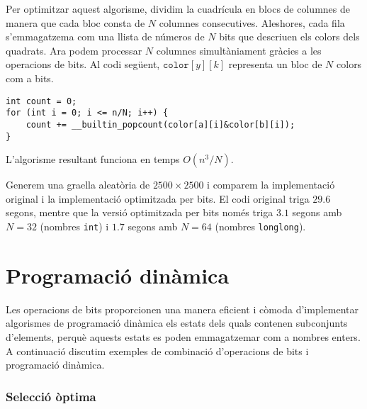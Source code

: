 Per optimitzar aquest algorisme, dividim la cuadrícula en blocs de
columnes de manera que cada bloc consta de $N$ columnes
consecutives. Aleshores, cada fila s'emmagatzema com una llista de
números de $N$ bits que descriuen els colors dels quadrats. Ara podem
processar $N$ columnes simultàniament gràcies a les operacions de
bits. Al codi següent, $\texttt{color}[y][k]$ representa un bloc de
$N$ colors com a bits.
\begin{lstlisting}
int count = 0;
for (int i = 0; i <= n/N; i++) {
    count += __builtin_popcount(color[a][i]&color[b][i]);
}
\end{lstlisting}
L'algorisme resultant funciona en temps $O(n^3/N)$.

Generem una graella aleatòria de $2500 \times 2500$ i comparem la
implementació original i la implementació optimitzada per bits. El
codi original triga $29.6$ segons, mentre que la versió optimitzada
per bits només triga $3.1$ segons amb $N=32$ (nombres
\texttt{int}) i $1.7$ segons amb $N=64$ (nombres \texttt{longlong}).

\section{Programació dinàmica}
\label{bits-dp}

Les operacions de bits proporcionen una manera eficient i còmoda
d'implementar algorismes de programació dinàmica els estats dels quals
contenen subconjunts d'elements, perquè aquests estats es poden
emmagatzemar com a nombres enters. A continuació discutim exemples de
combinació d'operacions de bits i programació dinàmica.

\subsubsection{Selecció òptima}

